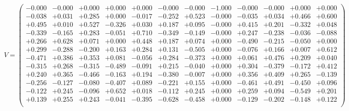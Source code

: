 \documentclass[9pt]{article}
\theoremstyle{plain}
\theoremstyle{definition}
\theoremstyle{remark}
\numberwithin{equation}{section}
\begin{document}
$V = \left(
\begin{array}{
cccccccccccc}
-0.000 & -0.000 & +0.000 & +0.000 & +0.000 & -0.000 & -0.000 & -1.000 & -0.000 & -0.000 & +0.000 & +0.000 \\
-0.038 & +0.031 & +0.285 & +0.000 & -0.017 & -0.252 & +0.523 & -0.000 & -0.035 & +0.034 & +0.466 & +0.600 \\
+0.495 & +0.010 & +0.527 & -0.326 & +0.030 & +0.187 & +0.095 & -0.000 & +0.415 & +0.201 & -0.332 & +0.048 \\
-0.339 & -0.165 & +0.283 & -0.051 & +0.710 & -0.349 & -0.149 & -0.000 & +0.247 & -0.238 & -0.036 & -0.088 \\
+0.266 & +0.628 & +0.071 & +0.000 & +0.448 & +0.187 & +0.074 & +0.000 & -0.490 & -0.215 & -0.050 & +0.000 \\
+0.299 & -0.288 & -0.200 & +0.163 & +0.284 & +0.131 & -0.505 & +0.000 & -0.076 & +0.166 & +0.007 & +0.612 \\
-0.471 & +0.386 & +0.353 & +0.081 & -0.056 & +0.284 & -0.373 & +0.000 & +0.061 & +0.476 & +0.209 & +0.040 \\
-0.315 & +0.268 & -0.315 & -0.489 & -0.091 & +0.215 & -0.040 & +0.000 & +0.304 & -0.379 & -0.172 & +0.412 \\
+0.240 & +0.365 & -0.466 & -0.163 & +0.194 & -0.380 & -0.007 & +0.000 & +0.356 & +0.409 & +0.265 & -0.139 \\
-0.256 & -0.127 & -0.080 & -0.407 & +0.089 & -0.221 & +0.155 & +0.000 & -0.461 & +0.491 & -0.450 & +0.096 \\
-0.122 & +0.245 & -0.096 & +0.652 & +0.018 & -0.112 & +0.245 & +0.000 & +0.259 & +0.094 & -0.549 & +0.201 \\
+0.139 & +0.255 & +0.243 & -0.041 & -0.395 & -0.628 & -0.458 & +0.000 & -0.129 & -0.202 & -0.148 & +0.122 \\
\end{array}
\right)$ \newline 
\end{document}
